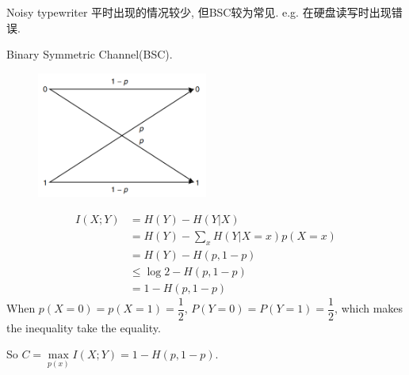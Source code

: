 Noisy typewriter 平时出现的情况较少, 但BSC较为常见. e.g. 在硬盘读写时出现错误.

\begin{example}
Binary Symmetric Channel(BSC).
\begin{figure}[htbp]
    \centering
    \includegraphics[width=0.5\textwidth]{./figures/chapter5/BSC.png}
\end{figure}
\begin{align*}
I(X;Y) &= H(Y)-H(Y|X) \\
&= H(Y) - \sum_{x}H(Y|X=x)p(X=x) \\
&= H(Y) - H\left(p, 1-p\right) \\
&\leq \log 2 - H\left(p, 1-p\right) \\
&= 1 - H\left(p, 1-p\right)
\end{align*}
When $p(X=0)=p(X=1)=\dfrac{1}{2}$, $P(Y=0)=P(Y=1)=\dfrac{1}{2}$, which makes the inequality take the equality.

So $C=\max\limits_{p(x)}I(X;Y)=1-H\left(p, 1-p\right)$.
\end{example}


